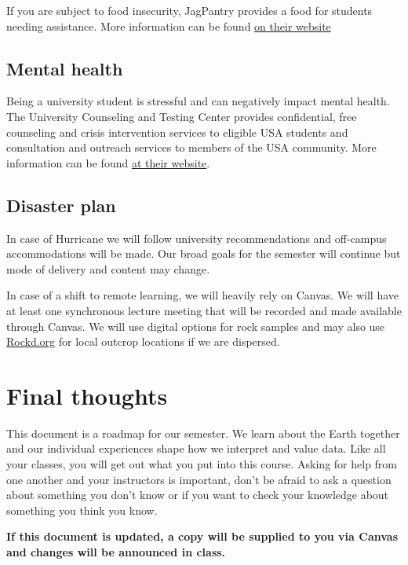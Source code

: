 \documentclass[11pt,]{article}
\begin{document}
If you are subject to food insecurity, JagPantry provides a food for
students needing assistance. More information can be found
\href{https://www.southalabama.edu/departments/sga/foodpantry.html}{on
their website}

\hypertarget{mental-health}{%
\subsection{Mental health}\label{mental-health}}

Being a university student is stressful and can negatively impact mental
health. The University Counseling and Testing Center provides
confidential, free counseling and crisis intervention services to
eligible USA students and consultation and outreach services to members
of the USA community. More information can be found
\href{https://www.southalabama.edu/departments/counseling/}{at their
website}.

\hypertarget{disaster-plan}{%
\subsection{Disaster plan}\label{disaster-plan}}

In case of Hurricane we will follow university recommendations and
off-campus accommodations will be made. Our broad goals for the semester
will continue but mode of delivery and content may change.

In case of a shift to remote learning, we will heavily rely on Canvas.
We will have at least one synchronous lecture meeting that will be
recorded and made available through Canvas. We will use digital options
for rock samples and may also use \href{https://rockd.org/}{Rockd.org}
for local outcrop locations if we are dispersed.

\hypertarget{final-thoughts}{%
\section{Final thoughts}\label{final-thoughts}}

This document is a roadmap for our semester. We learn about the Earth
together and our individual experiences shape how we interpret and value
data. Like all your classes, you will get out what you put into this
course. Asking for help from one another and your instructors is
important, don't be afraid to ask a question about something you don't
know or if you want to check your knowledge about something you think
you know.

\textbf{If this document is updated, a copy will be supplied to you via
Canvas and changes will be announced in class.}
\end{document}
